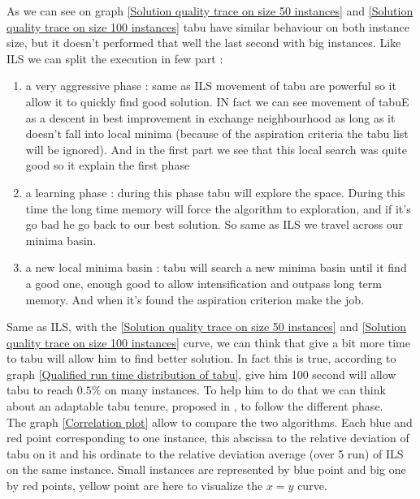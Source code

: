 \documentclass[12pt,a4paper]{article}
\begin{document}
As we can see on graph \ref{Solution quality trace on size 50 instances} and \ref{Solution quality trace on size 100 instances} tabu have similar behaviour on both instance size, but it doesn't performed that well the last second with big instances. Like ILS we can split the execution in few part :
\begin{enumerate}[1 - ]
\item
a very aggressive phase : same as ILS movement of tabu are powerful so it allow it to quickly find good solution. IN fact we can see movement of tabuE as a descent in best improvement in exchange neighbourhood as long as it doesn't fall into local minima (because of the aspiration criteria the tabu list will be ignored). And in the first part we see that this local search was quite good so it explain the first phase
\item
a learning phase : during this phase tabu will explore the space. During this time the long time memory will force the algorithm to exploration, and if it's go bad he go back to our best solution. So same as ILS we travel across our minima basin.
\item
a new local minima basin : tabu will search a new minima basin until it find a good one, enough good to allow intensification and outpass long term memory. And when it's found the aspiration criterion make the job.
\end{enumerate}
Same as ILS, with the \ref{Solution quality trace on size 50 instances} and \ref{Solution quality trace on size 100 instances} curve, we can think that give a bit more time to tabu will allow him to find better solution. In fact this is true, according to graph \ref{Qualified run time distribution of tabu}, give him 100 second will allow tabu to reach $0.5 \%$ on many instances. To help him to do that we can think about an adaptable tabu tenure, proposed in \cite{Battiti1996}, to follow the different phase.\\

The graph \ref{Correlation plot} allow to compare the two algorithms. Each blue and red point corresponding to one instance, this abscissa to the relative deviation of tabu on it and his ordinate to the relative deviation average (over 5 run) of ILS on the same instance. Small instances are represented by blue point and big one by red points, yellow point are here to visualize the $x=y$ curve.
\end{document}
